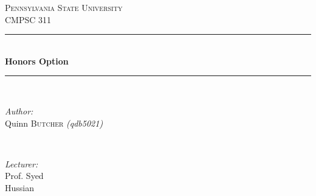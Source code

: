 \documentclass[11pt]{article}
\begin{document}
\begin{titlepage}

\newcommand{\HRule}{\rule{\linewidth}{0.5mm}} %

\center %
 

\textsc{\LARGE Pennsylvania State University}\\[1.5cm] 
\textsc{\Large CMPSC 311}\\[0.5cm] 


\HRule \\[0.4cm]
{ \huge \bfseries Honors Option}\\[0.4cm] %
\HRule \\[1.5cm]
 

\begin{minipage}{0.4\textwidth}
\begin{flushleft} \large
\emph{Author:}\\
Quinn \textsc{Butcher} \textit{(qdb5021)} \\
\end{flushleft}
\end{minipage}
~
\begin{minipage}{0.4\textwidth}
\begin{flushright} \large
\emph{Lecturer:} \\
Prof. Syed  \\Hussian\\
\end{flushright}
\end{minipage}\\[2cm]




\end{titlepage}
\end{document}

